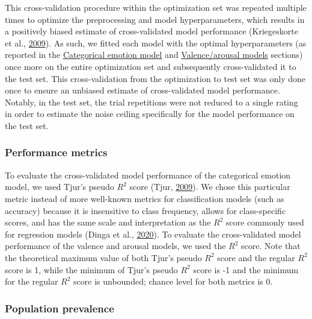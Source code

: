 \documentclass[11pt,american,a4paper,oneside,]{memoir} %
\begin{document}
This cross-validation procedure within the optimization set was repeated multiple times to optimize the preprocessing and model hyperparameters, which results in a positively biased estimate of cross-validated model performance (Kriegeskorte et al., \protect\hyperlink{ref-kriegeskorte2009circular}{2009}). As such, we fitted each model with the optimal hyperparameters (as reported in the \protect\hyperlink{svsd-cat-emo}{Categorical emotion model} and \protect\hyperlink{svsd-valaro}{Valence/arousal models} sections) once more on the entire optimization set and subsequently cross-validated it to the test set. This cross-validation from the optimization to test set was only done once to ensure an unbiased estimate of cross-validated model performance. Notably, in the test set, the trial repetitions were not reduced to a single rating in order to estimate the noise ceiling specifically for the model performance on the test set.

\hypertarget{svsd-perf}{%
\subsubsection{Performance metrics}\label{svsd-perf}}

To evaluate the cross-validated model performance of the categorical emotion model, we used Tjur's pseudo \(R^{2}\) score (Tjur, \protect\hyperlink{ref-Tjur2009-dp}{2009}). We chose this particular metric instead of more well-known metrics for classification models (such as accuracy) because it is insensitive to class frequency, allows for class-specific scores, and has the same scale and interpretation as the \(R^{2}\) score commonly used for regression models (Dinga et al., \protect\hyperlink{ref-Dinga2020-si}{2020}). To evaluate the cross-validated model performance of the valence and arousal models, we used the \(R^{2}\) score. Note that the theoretical maximum value of both Tjur's pseudo \(R^{2}\) score and the regular \(R^{2}\) score is 1, while the minimum of Tjur's pseudo \(R^{2}\) score is -1 and the minimum for the regular \(R^{2}\) score is unbounded; chance level for both metrics is 0.

\hypertarget{population-prevalence}{%
\subsubsection{Population prevalence}\label{population-prevalence}}
\end{document}
